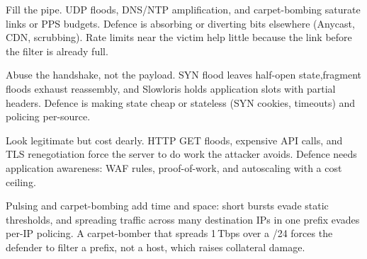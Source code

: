 \begin{description}[leftmargin=1.2em,itemsep=0.35em]
    \item[Volumetric] Fill the pipe. UDP floods, DNS/NTP amplification, and carpet-bombing saturate links or PPS budgets. Defence is absorbing or diverting bits elsewhere (Anycast, CDN, scrubbing). Rate limits near the victim help little because the link before the filter is already full.
    \item[Protocol] Abuse the handshake, not the payload. SYN flood leaves half-open state,fragment floods exhaust reassembly, and Slowloris holds application slots with partial headers. Defence is making state cheap or stateless (SYN cookies, timeouts) and policing per-source.
    \item[Application] Look legitimate but cost dearly. HTTP GET floods, expensive API calls, and TLS renegotiation force the server to do work the attacker avoids. Defence needs application awareness: WAF rules, proof-of-work, and autoscaling with a cost ceiling.
\end{description}

Pulsing and carpet-bombing add time and space: short bursts evade static thresholds, and spreading traffic across many destination IPs in one prefix evades per-IP policing. A carpet-bomber that spreads 1\,Tbps over a /24 forces the defender to filter a prefix, not a host, which raises collateral damage.

